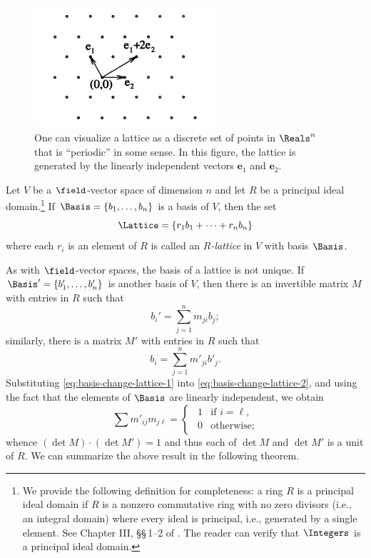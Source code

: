 \begin{figure}[btp]
    \centering
    \includegraphics[width=0.6\textwidth]{assets/lattices.png}
    \caption[Visualizing lattices.]{One can visualize a lattice as a discrete
    set of points in \(\Reals^n\) that is ``periodic'' in some sense. In this
    figure, the lattice is generated by the linearly independent vectors
    \(\mathbf{e}_1\) and \(\mathbf{e}_2\).\,\cite{conway1997sensual}}
    \label{fig:lattice}
\end{figure}

Let \(V\) be a \(\field\)-vector space of dimension \(n\) and let \(R\) be a
    principal ideal domain.\footnote{ We provide the following definition for
    completeness: a ring \(R\) is a principal ideal domain if \(R\) is a nonzero
    commutative ring with no zero divisors (i.e., an integral domain) where
    every ideal is principal, i.e., generated by a single element. See Chapter
    III, \S\S\,1--2 of \cite{hungerford2012algebra}. The reader can verify that
    \(\Integers\) is a principal ideal domain. } If \(\Basis = \{b_1, \dots,
    b_n\}\) is a basis of \(V\), then the set
\[
    \Lattice = \{r_1 b_1 + \dots + r_n b_n \}
\]
where each \(r_i\) is an element of \(R\) is called an \emph{\(R\)-lattice} in
\(V\) with basis \(\Basis\).

As with \(\field\)-vector spaces, the basis of a lattice is not unique. If
\(\Basis' = \{b_1', \dots, b_n'\}\) is another basis of \(V\), then there is an
invertible matrix \(M\) with entries in \(R\) such that
\begin{equation}\label{eq:basis-change-lattice-1}
    b_i' = \sum_{j=1}^n m_{ji} b_j;
\end{equation}
similarly, there is a matrix \(M'\) with entries in \(R\) such that
\begin{equation}\label{eq:basis-change-lattice-2}
    b_i  = \sum_{j=1}^n m'_{ji} b'_j.
\end{equation}
Substituting \eqref{eq:basis-change-lattice-1} into
\eqref{eq:basis-change-lattice-2}, and using the fact that the elements of
\(\Basis\) are linearly independent, we obtain
\[
    \sum m'_{ij}m_{j\ell} =
    \begin{cases}
        \ \ 1 & \text{if } i = \ell,\\
        \ \ 0 & \text{otherwise};
    \end{cases}
\]
whence \((\det M) \cdot (\det M') = 1\) and thus each of \(\det M\) and \(\det
M'\) is a unit of \(R\). We can summarize the above result in the following
theorem.

